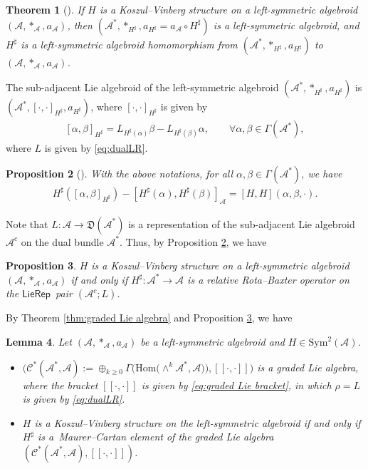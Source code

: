 \documentclass[pdftex]{sigma}%
\numberwithin{equation}{section}
\newtheorem{thm}{Theorem}[section]
\newtheorem{lem}[thm]{Lemma}
\newtheorem{pro}[thm]{Proposition}
\newcommand{\huaA}{\mathcal{A}}
\newcommand{\huaC}{\mathcal{C}}
\newcommand{\frkD}{\mathfrak D}
\newcommand{\Courant}[1]{\left[\!\left[ #1\right]\!\right]}
\newcommand{\Hom}{\mathrm{Hom}}
\newcommand{\Sym}{\mathrm{Sym}}
\newcommand{\LP}{$\mathsf{LieRep}$~}
\begin{document}
{\sloppy\begin{thm}[\cite{lsb2}]\label{thm:LSBi-H}
If $H$ is a Koszul--Vinberg structure on a left-symmetric algebroid $(\huaA,\ast_\huaA,a_\huaA)$, then $(\huaA^*,\ast_{H^\sharp},a_{H^\sharp}=a_\huaA\circ H^\sharp)$ is a left-symmetric algebroid, and $H^\sharp$ is a left-symmetric algebroid homomorphism from $(\huaA^*,\ast_{H^\sharp},a_{H^\sharp})$ to $(\huaA,\ast_\huaA,a_\huaA)$.
\end{thm}}

{\sloppy The sub-adjacent Lie algebroid of the left-symmetric algebroid $(\huaA^*,\ast_{H^\sharp},a_{H^\sharp})$ is $(\huaA^*,[\cdot,\cdot]_{H^\sharp},a_{H^\sharp})$, where $[\cdot,\cdot]_{H^\sharp}$ is given by
\begin{gather}\label{eq:commutator-H}
 [\alpha,\beta]_{H^\sharp}=L_{H^\sharp(\alpha)}\beta-L_{H^\sharp(\beta)}\alpha,\qquad
 \forall \alpha,\beta\in\Gamma(\huaA^*),
\end{gather}}\noindent
where $L$ is given by \eqref{eq:dualLR}.


\begin{pro}[\cite{lsb2}]\label{pro:morphism}
With the above notations,
for all $\alpha,\beta\in\Gamma(\huaA^*)$, we have
\begin{gather*}
H^\sharp({[\alpha,\beta]}_{H^\sharp})-[H^\sharp(\alpha), H^\sharp(\beta)]_\huaA=[ H,H](\alpha,\beta,\cdot).
\end{gather*}
\end{pro}


Note that $L\colon \huaA\longrightarrow \frkD(\huaA^*)$ is a representation of the sub-adjacent Lie algebroid $\huaA^c$ on the dual bundle $\huaA^*$. Thus, by Proposition \ref{pro:morphism}, we have
\begin{pro}\label{pro:LSBi-H}
 $H$ is a Koszul--Vinberg structure on a left-symmetric algebroid $(\huaA,\ast_\huaA,a_\huaA)$ if and only if $H^\sharp\colon \huaA^*\longrightarrow \huaA $ is a relative Rota--Baxter operator on the \LP pair $(\huaA^c;L)$.
\end{pro}

By Theorem \ref{thm:graded Lie algebra} and Proposition \ref{pro:LSBi-H}, we have
\begin{lem}\label{lem:graded Lie algbra}
Let $(\huaA,\ast_\huaA,a_\huaA)$ be a left-symmetric algebroid and $H\in \Sym^2(\huaA)$.	
\begin{itemize}\itemsep=0pt
\item[$(i)$] $\big(\huaC^*(\huaA^*,\huaA):=\oplus_{k\geq0}\Gamma\big(\Hom\big({\wedge}^{k}\huaA^*,\huaA\big)\big),\Courant{\cdot,\cdot}\big)$ is a graded Lie algebra, where the bracket $\Courant{\cdot,\cdot}$ is given by \eqref{eq:graded Lie bracket}, in which $\rho=L$ is given by \eqref{eq:dualLR}.
\item[$(ii)$] $H$ is a Koszul--Vinberg structure on the left-symmetric algebroid if and only if $H^\sharp$ is a~Maurer--Cartan element of the graded Lie algebra $(\huaC^*(\huaA^*,\huaA),\Courant{\cdot,\cdot})$.
\end{itemize}
\end{lem}
\end{document}
